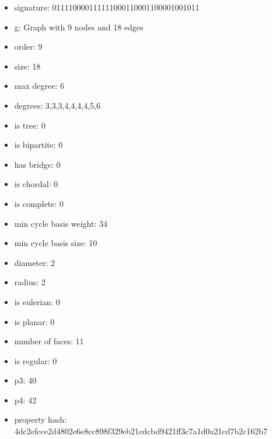 \newpage
\begin{figure}
\end{figure}
\begin{itemize}
\item signature: 011110000111111000110001100001001011
\item g: Graph with 9 nodes and 18 edges
\item order: 9
\item size: 18
\item max degree: 6
\item degrees: 3,3,3,4,4,4,4,5,6
\item is tree: 0
\item is bipartite: 0
\item has bridge: 0
\item is chordal: 0
\item is complete: 0
\item min cycle basis weight: 34
\item min cycle basis size: 10
\item diameter: 2
\item radius: 2
\item is eulerian: 0
\item is planar: 0
\item number of faces: 11
\item is regular: 0
\item p3: 40
\item p4: 42
\item property hash: 4dc2efcce2d4802e6e8cc898f329eb21cdcbd9421ff3c7a1d0a21cd7b2c162b7
\end{itemize}
